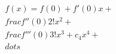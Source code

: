 \documentclass[preview]{standalone}
\begin{document}
\begin{align*}
f(x) = f(0) + f'(0)x + \\frac{f''(0)}{2!}x^2 + \\frac{f'''(0)}{3!}x^3 + c_4 x^4 + \\dots
\end{align*}
\end{document}
